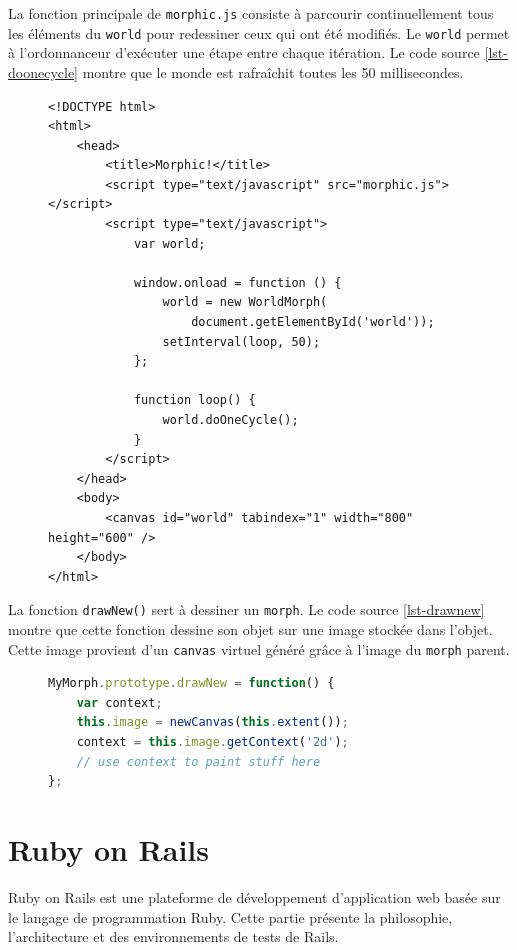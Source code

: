 La fonction principale de \texttt{morphic.js} consiste à parcourir continuellement tous les éléments du \texttt{world} pour redessiner ceux qui ont été modifiés. Le \texttt{world} permet à l'ordonnanceur d'exécuter une étape entre chaque itération. Le code source \ref{lst-doonecycle} montre que le monde est rafraîchit toutes les 50 millisecondes.
\begin{figure}
\begin{lstlisting}[caption={Exemple d'utilisation de \texttt{morphic.js}},label=lst-doonecycle,language=HTML5,alsolanguage=JavaScript]
<!DOCTYPE html>
<html>
    <head>
        <title>Morphic!</title>
        <script type="text/javascript" src="morphic.js"></script>
        <script type="text/javascript">
            var world;

            window.onload = function () {
                world = new WorldMorph(
                    document.getElementById('world'));
                setInterval(loop, 50);
            };

            function loop() {
                world.doOneCycle();
            }
        </script>
    </head>
    <body>
        <canvas id="world" tabindex="1" width="800" height="600" />
    </body>
</html>
\end{lstlisting}
\end{figure}
La fonction \texttt{drawNew()} sert à dessiner un \texttt{morph}. Le code source \ref{lst-drawnew} montre que cette fonction dessine son objet sur une image stockée dans l'objet. Cette image provient d'un \texttt{canvas} virtuel généré grâce à l'image du \texttt{morph} parent.

\begin{figure}
\begin{lstlisting}[caption={Modèle pour la fonction \texttt{drawNew()}},label=lst-drawnew,language=JavaScript]
MyMorph.prototype.drawNew = function() {
    var context;
    this.image = newCanvas(this.extent());
    context = this.image.getContext('2d');
    // use context to paint stuff here
};
\end{lstlisting}
\end{figure}

\section{Ruby on Rails}
\label{rails} 
Ruby on Rails est une plateforme de développement d'application web basée sur le langage de programmation Ruby. Cette partie présente la philosophie, l'architecture et des environnements de tests de Rails.

